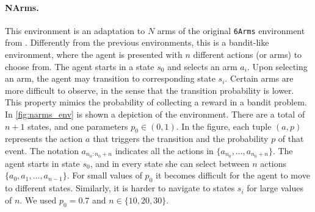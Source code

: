 \paragraph{NArms.} This environment is an adaptation to $N$ arms of the original {\tt 6Arms} environment from  \cite{strehl2004empirical}. Differently from the previous environments, this is a bandit-like environment, where the agent is presented with $n$ different actions (or arms) to choose from. The agent starts in a state $s_0$ and selects an arm $a_i$. Upon selecting an arm, the agent may transition to corresponding state $s_i$. Certain arms are more difficult to observe, in the sense that the transition probability is lower. This property mimics the  probability of collecting a reward in a bandit problem.
In \cref{fig:narms_env} is shown a depiction of the environment. There are a total of $n+1$ states, and one parameters $p_0\in (0,1)$. In the figure, each tuple $(a,p)$ represents the  action $a$ that triggers the transition and the probability $p$ of that event. The notation  $a_{n_0:n_0+n}$ indicates  all the actions in $\{a_{n_0},\dots,a_{n_0+n}\}$.
The agent starts in state $s_0$, and in every state she can select between $n$ actions $\{a_0,a_1,\dots, a_{n-1}\}$. For small values of $p_0$ it becomes difficult for the agent to move to different states. Similarly, it is harder to navigate to states $s_i$ for large values of $n$. We used $p_0=0.7$ and $n\in \{10,20,30\}$.





